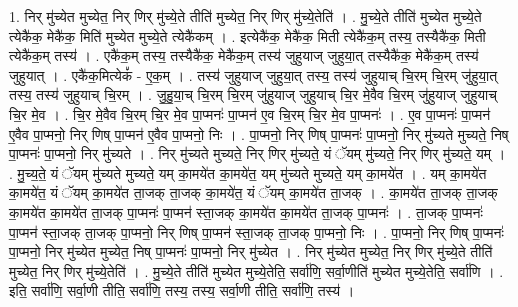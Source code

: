 \documentclass[17pt]{extarticle}
\begin{document}
1. निर् मु॑च्येत मुच्येत॒ निर् णिर् मु॑च्ये॒ते तीति॑ मुच्येत॒ निर् णिर् मु॑च्ये॒तेति॑ । . मु॒च्ये॒ते तीति॑ मुच्येत मुच्ये॒ते त्येकै॑क॒ मेकै॑क॒ मिति॑ मुच्येत मुच्ये॒ते त्येकै॑कम् । . इत्येकै॑क॒ मेकै॑क॒ मिती त्येकै॑क॒म् तस्य॒ तस्यैकै॑क॒ मिती त्येकै॑क॒म् तस्य॑ । . एकै॑क॒म् तस्य॒ तस्यैकै॑क॒ मेकै॑क॒म् तस्य॑ जुहुयाज् जुहुया॒त् तस्यैकै॑क॒ मेकै॑क॒म् तस्य॑ जुहुयात् । . एकै॑क॒मित्येकं᳚ - ए॒क॒म् । . तस्य॑ जुहुयाज् जुहुया॒त् तस्य॒ तस्य॑ जुहुयाच् चि॒रम् चि॒रम् जु॑हुया॒त् तस्य॒ तस्य॑ जुहुयाच् चि॒रम् । . जु॒हु॒या॒च् चि॒रम् चि॒रम् जु॑हुयाज् जुहुयाच् चि॒र मे॒वैव चि॒रम् जु॑हुयाज् जुहुयाच् चि॒र मे॒व । . चि॒र मे॒वैव चि॒रम् चि॒र मे॒व पा॒प्मनः॑ पा॒प्मन॑ ए॒व चि॒रम् चि॒र मे॒व पा॒प्मनः॑ । . ए॒व पा॒प्मनः॑ पा॒प्मन॑ ए॒वैव पा॒प्मनो॒ निर् णिष् पा॒प्मन॑ ए॒वैव पा॒प्मनो॒ निः । . पा॒प्मनो॒ निर् णिष् पा॒प्मनः॑ पा॒प्मनो॒ निर् मु॑च्यते मुच्यते॒ निष् पा॒प्मनः॑ पा॒प्मनो॒ निर् मु॑च्यते । . निर् मु॑च्यते मुच्यते॒ निर् णिर् मु॑च्यते॒ यं ॅयम् मु॑च्यते॒ निर् णिर् मु॑च्यते॒ यम् । . मु॒च्य॒ते॒ यं ॅयम् मु॑च्यते मुच्यते॒ यम् का॒मये॑त का॒मये॑त॒ यम् मु॑च्यते मुच्यते॒ यम् का॒मये॑त । . यम् का॒मये॑त का॒मये॑त॒ यं ॅयम् का॒मये॑त ता॒जक् ता॒जक् का॒मये॑त॒ यं ॅयम् का॒मये॑त ता॒जक् । . का॒मये॑त ता॒जक् ता॒जक् का॒मये॑त का॒मये॑त ता॒जक् पा॒प्मनः॑ पा॒प्मन॑ स्ता॒जक् का॒मये॑त का॒मये॑त ता॒जक् पा॒प्मनः॑ । . ता॒जक् पा॒प्मनः॑ पा॒प्मन॑ स्ता॒जक् ता॒जक् पा॒प्मनो॒ निर् णिष् पा॒प्मन॑ स्ता॒जक् ता॒जक् पा॒प्मनो॒ निः । . पा॒प्मनो॒ निर् णिष् पा॒प्मनः॑ पा॒प्मनो॒ निर् मु॑च्येत मुच्येत॒ निष् पा॒प्मनः॑ पा॒प्मनो॒ निर् मु॑च्येत । . निर् मु॑च्येत मुच्येत॒ निर् णिर् मु॑च्ये॒ते तीति॑ मुच्येत॒ निर् णिर् मु॑च्ये॒तेति॑ । . मु॒च्ये॒ते तीति॑ मुच्येत मुच्ये॒तेति॒ सर्वा॑णि॒ सर्वा॒णीति॑ मुच्येत मुच्ये॒तेति॒ सर्वा॑णि । . इति॒ सर्वा॑णि॒ सर्वा॒णी तीति॒ सर्वा॑णि॒ तस्य॒ तस्य॒ सर्वा॒णी तीति॒ सर्वा॑णि॒ तस्य॑ । \newline
\end{document}
